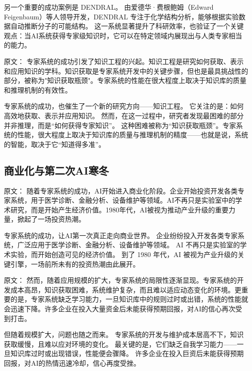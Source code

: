 另一个重要的成功案例是 DENDRAL。  
由爱德华·费根鲍姆（Edward Feigenbaum）等人领导开发，DENDRAL 专注于化学结构分析，能够根据实验数据自动推断分子的可能结构。  
这一系统显著提升了科研效率，也验证了一个关键观点：当AI系统获得专家级知识时，它可以在特定领域内展现出与人类专家相当的能力。

原文：
专家系统的成功引发了知识工程的兴起。知识工程是研究如何获取、表示和应用知识的学科。知识获取是专家系统开发中的关键步骤，但也是最具挑战性的部分，被称为"知识获取瓶颈"。专家系统的性能在很大程度上取决于知识库的质量和推理机制的有效性。

专家系统的成功，也催生了一个新的研究方向——知识工程。  
它关注的是：如何高效地获取、表示并应用知识。  
然而，在这一过程中，研究者发现最困难的部分并非推理，而是“如何获得专家知识”。  
这种困难被称为“知识获取瓶颈”。专家系统的性能，很大程度上取决于知识库的质量与推理机制的精度——也就是说，系统的智能，取决于它“知道得多准”。

\subsection{商业化与第二次AI寒冬}

原文：
随着专家系统的成功，AI开始进入商业化阶段。企业开始投资开发各类专家系统，用于医学诊断、金融分析、设备维护等领域。AI不再只是实验室中的学术研究，而是开始产生经济价值。1980年代，AI被视为推动产业升级的重要力量，掀起了一场投资热潮。

专家系统的成功，让AI第一次真正走向商业世界。  
企业纷纷投入开发各类专家系统，广泛应用于医学诊断、金融分析、设备维护等领域。  
AI 不再只是实验室的学术实验，而开始创造可见的经济价值。  
到了 1980 年代，AI 被视为产业升级的关键引擎，一场前所未有的投资热潮由此展开。

原文：
然而，随着应用规模的扩大，专家系统的局限性逐渐显现。专家系统的开发成本高昂，知识获取困难，系统维护复杂，而且难以适应动态变化的环境。更重要的是，专家系统缺乏学习能力，一旦知识库中的规则过时或出错，系统的性能就会迅速下降。许多企业在投入大量资金后未能获得预期回报，对AI的信心再次受到打击。

但随着规模扩大，问题也随之而来。  
专家系统的开发与维护成本居高不下，知识获取缓慢，且难以应对环境的变化。  
最关键的是，它们缺乏自我学习能力——一旦知识库过时或出现错误，性能便会骤降。  
许多企业在投入巨资后未能获得预期回报，对AI的热情迅速冷却，信心再度受挫。

